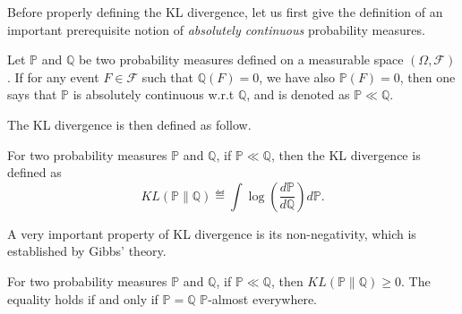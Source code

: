 Before properly defining the KL divergence, let us first give the definition of an important prerequisite notion of \textit{absolutely continuous} probability measures.

\begin{definition}\label{def:maths.absolute_continuous}
\begin{leftbar}[defnbar]
	Let $\mathbb{P}$ and $\mathbb{Q}$ be two probability measures defined on a measurable space $(\Omega,\mathcal{F})$. If for any event $F \in \mathcal{F}$ such that $\mathbb{Q}(F) = 0$, we have also $\mathbb{P}(F) = 0$, then one says that $\mathbb{P}$ is absolutely continuous w.r.t $\mathbb{Q}$, and is denoted as $\mathbb{P} \ll \mathbb{Q}$.
\end{leftbar}
\end{definition}

The KL divergence is then defined as follow.

\begin{definition}[KL divergence]\label{def:maths.kl}
\begin{leftbar}[defnbar]
	For two probability measures $\mathbb{P}$ and $\mathbb{Q}$, if $\mathbb{P} \ll \mathbb{Q}$, then the KL divergence is defined as
	\[
		KL(\mathbb{P} \lVert \mathbb{Q}) \eqdef \int \log(\frac{d\mathbb{P}}{d\mathbb{Q}})d\mathbb{P}.
	\]
\end{leftbar}
\end{definition}

A very important property of KL divergence is its non-negativity, which is established by Gibbs' theory.

\begin{theorem}\label{thm:maths.gibbs}
\begin{leftbar}[theorembar]
	For two probability measures $\mathbb{P}$ and $\mathbb{Q}$, if $\mathbb{P} \ll \mathbb{Q}$, then $KL(\mathbb{P} \lVert \mathbb{Q}) \geq 0$. The equality holds if and only if $\mathbb{P} = \mathbb{Q}$ $\mathbb{P}$-almost everywhere.
\end{leftbar}
\end{theorem}



